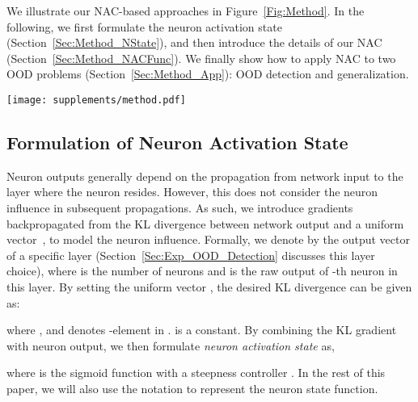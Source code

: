 \documentclass{article} \usepackage{iclr2024_conference,times}
\begin{document}
We illustrate our {NAC}-based approaches in Figure~\ref{Fig:Method}. In the following, we first formulate the neuron activation state (Section~\ref{Sec:Method_NState}), and then introduce the details of our NAC (Section~\ref{Sec:Method_NACFunc}). We finally show how to apply NAC to two OOD problems (Section~\ref{Sec:Method_App}): OOD detection and generalization.


\begin{figure*}
	[t]
	\centering \texttt{[image: supplements/method.pdf]} \vspace{-2mm}
\caption{Illustration of our NAC-based methods. NAC is derived from the probability density function (PDF), which quantifies the coverage degree of neuron states under the InD training set .
Building upon NAC, we devise two approaches for tackling different OOD problems: OOD Detection (\texttt{NAC-UE}) and OOD Generalization (\texttt{NAC-ME}).
}
	\label{Fig:Method}
	\vspace{-2mm}
\end{figure*}



\vspace{-1mm}
\subsection{Formulation of Neuron Activation State} 
\vspace{-1mm}
\label{Sec:Method_NState}
Neuron outputs generally depend on the propagation from network input to the layer where the neuron resides. However, this does not consider the neuron influence in subsequent propagations.
{As such, we introduce gradients backpropagated from the KL divergence between network output and a uniform vector~\citep{OOD_Detect:GradNorm}, to model the neuron influence. }
Formally, we denote by  the output vector of a specific layer (Section~\ref{Sec:Exp_OOD_Detection} discusses this layer choice), where  is the number of neurons and  is the raw output of -th neuron in this layer.
By setting the uniform vector , the desired KL divergence can be given as:
\vspace{-2mm}

where , and  denotes -element in .  is a constant. 
By combining the KL gradient with neuron output, we then formulate \textit{neuron activation state} as, 
\vspace{-0.5mm}

where  is the sigmoid function with a steepness controller . 
In the rest of this paper, we will also use the notation  to represent the neuron state function.
\end{document}
